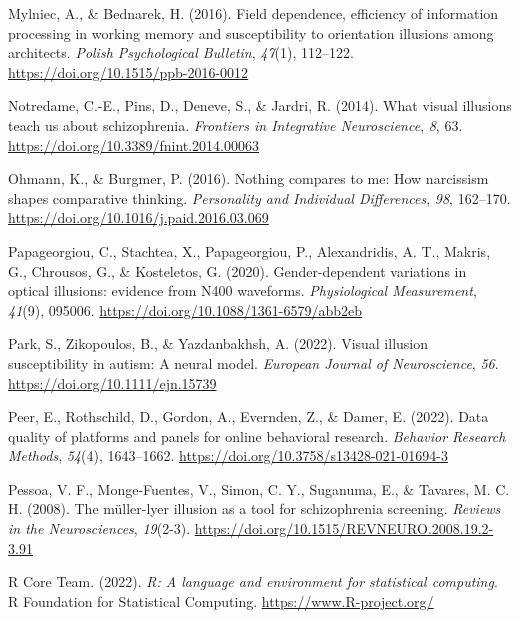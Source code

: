 \documentclass[
  man,floatsintext]{apa6}
\newlength{\cslhangindent}
\newlength{\cslentryspacingunit} %
\newenvironment{CSLReferences}[2] %
 {%
  \setlength{\parindent}{0pt}
  \ifodd #1
  \let\oldpar\par
  \def\par{\hangindent=\cslhangindent\oldpar}
  \fi
  \setlength{\parskip}{#2\cslentryspacingunit}
 }%
 {}
\begin{document}
\begin{CSLReferences}{1}{0}
\leavevmode{}%
Mylniec, A., \& Bednarek, H. (2016). Field dependence, efficiency of information processing in working memory and susceptibility to orientation illusions among architects. \emph{Polish Psychological Bulletin}, \emph{47}(1), 112--122. \url{https://doi.org/10.1515/ppb-2016-0012}

\leavevmode{}%
Notredame, C.-E., Pins, D., Deneve, S., \& Jardri, R. (2014). What visual illusions teach us about schizophrenia. \emph{Frontiers in Integrative Neuroscience}, \emph{8}, 63. \url{https://doi.org/10.3389/fnint.2014.00063}

\leavevmode{}%
Ohmann, K., \& Burgmer, P. (2016). Nothing compares to me: How narcissism shapes comparative thinking. \emph{Personality and Individual Differences}, \emph{98}, 162--170. \url{https://doi.org/10.1016/j.paid.2016.03.069}

\leavevmode{}%
Papageorgiou, C., Stachtea, X., Papageorgiou, P., Alexandridis, A. T., Makris, G., Chrousos, G., \& Kosteletos, G. (2020). Gender-dependent variations in optical illusions: evidence from N400 waveforms. \emph{Physiological Measurement}, \emph{41}(9), 095006. \url{https://doi.org/10.1088/1361-6579/abb2eb}

\leavevmode{}%
Park, S., Zikopoulos, B., \& Yazdanbakhsh, A. (2022). Visual illusion susceptibility in autism: A neural model. \emph{European Journal of Neuroscience}, \emph{56}. \url{https://doi.org/10.1111/ejn.15739}

\leavevmode{}%
Peer, E., Rothschild, D., Gordon, A., Evernden, Z., \& Damer, E. (2022). Data quality of platforms and panels for online behavioral research. \emph{Behavior Research Methods}, \emph{54}(4), 1643--1662. \url{https://doi.org/10.3758/s13428-021-01694-3}

\leavevmode{}%
Pessoa, V. F., Monge-Fuentes, V., Simon, C. Y., Suganuma, E., \& Tavares, M. C. H. (2008). The müller-lyer illusion as a tool for schizophrenia screening. \emph{Reviews in the Neurosciences}, \emph{19}(2-3). \url{https://doi.org/10.1515/REVNEURO.2008.19.2-3.91}

\leavevmode{}%
R Core Team. (2022). \emph{R: A language and environment for statistical computing}. R Foundation for Statistical Computing. \url{https://www.R-project.org/}


\end{CSLReferences}
\end{document}
